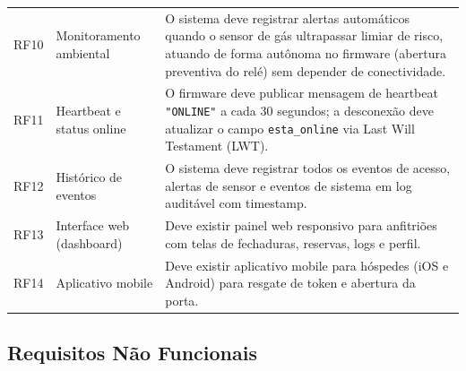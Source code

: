 \documentclass[12pt,a4paper]{article}
\begin{document}
\begin{longtable}{p{1.100cm} p{3.800cm} p{10.00cm}}
  RF10 & Monitoramento ambiental & O sistema deve registrar alertas automáticos quando
         o sensor de gás ultrapassar limiar de risco, atuando de forma autônoma no
         firmware (abertura preventiva do relé) sem depender de conectividade. \\[3pt]

  RF11 & Heartbeat e status online & O firmware deve publicar mensagem de heartbeat
         \texttt{"ONLINE"} a cada 30 segundos; a desconexão deve atualizar o campo
         \texttt{esta\_online} via Last Will Testament (LWT). \\[3pt]

  RF12 & Histórico de eventos & O sistema deve registrar todos os eventos de acesso,
         alertas de sensor e eventos de sistema em log auditável com timestamp. \\[3pt]

  RF13 & Interface web (dashboard) & Deve existir painel web responsivo para anfitriões
         com telas de fechaduras, reservas, logs e perfil. \\[3pt]

  RF14 & Aplicativo mobile & Deve existir aplicativo mobile para hóspedes (iOS e
         Android) para resgate de token e abertura da porta. \\[3pt]
\end{longtable}

\subsection{Requisitos Não Funcionais}
\end{document}
